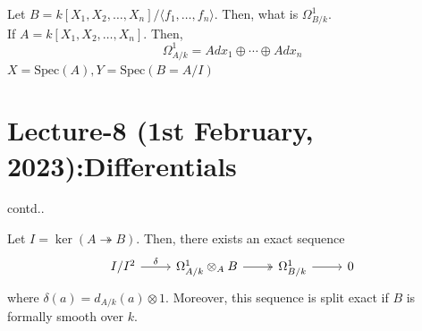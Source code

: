 \documentclass[oneside, 12pt, ]{scrbook}
\newcommand{\spec}{\mathrm{Spec}}
\theoremstyle{theorem}
\begin{document}
\begin{example}
Let $B = k[X_{1},X_{2}, \hdots , X_{n}]/\langle f_{1}, \hdots , f_{n} \rangle$. Then, what is $\Omega_{B/k}^{1}$. \\

If $A = k[X_{1}, X_{2}, \hdots , X_{n}]$. Then, $$\Omega_{A/k}^{1} = Adx_{1} \oplus \cdots \oplus Adx_{n}$$ 
$X= \spec(A), Y = \spec(B = A/I)$
\end{example}


\chapter{Lecture-8 (1st February, 2023):Differentials}

contd..
\begin{theorem}
Let $I = \ker(A \twoheadrightarrow B)$. Then, there exists an exact sequence \[\begin{tikzcd}
	{I/I^2} & {\Omega_{A/k}^{1} \otimes_{A} B} & {\Omega_{B/k}^{1}} & 0
	\arrow[two heads, from=1-2, to=1-3]
	\arrow["\delta", from=1-1, to=1-2]
	\arrow[from=1-3, to=1-4]
\end{tikzcd}\] where $\delta(a) = d_{A/k} (a) \otimes 1$. Moreover, this sequence is split exact if $B$ is formally smooth over $k$.
\end{theorem}
\end{document}
